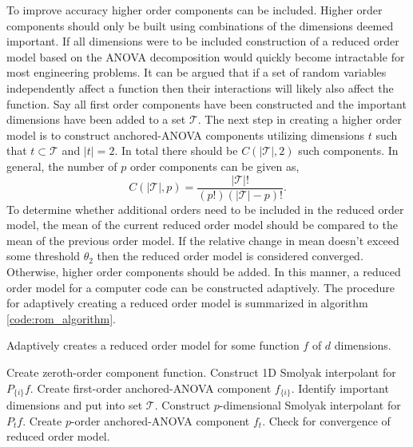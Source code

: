To improve accuracy higher order components can be included. Higher order components should only be built using combinations of the dimensions deemed important. If all dimensions were to be included construction of a reduced order model based on the \ac{ANOVA} decomposition would quickly become intractable for most engineering problems. It can be argued that if a set of random variables independently affect a function then their interactions will likely also affect the function. Say all first order components have been constructed and the important dimensions have been added to a set $\mathcal{T}$. The next step in creating a higher order model is to construct anchored-\ac{ANOVA} components utilizing dimensions $t$ such that $t\subset\mathcal{T}$ and $\vert t\vert=2$. In total there should be $C(\vert\mathcal{T}\vert,2)$ such components. In general, the number of $p$ order components can be given as,
\begin{equation} \label{eq:num_components_rom_order_p}
   C(\vert\mathcal{T}\vert,p) = \frac{\vert\mathcal{T}\vert!}{
    (p!)(\vert\mathcal{T}\vert-p)!}.
\end{equation}
To determine whether additional orders need to be included in the reduced order model, the mean of the current reduced order model should be compared to the mean of the previous order model. If the relative change in mean doesn't exceed some threshold $\theta_2$ then the reduced order model is considered converged. Otherwise, higher order components should be added. In this manner, a reduced order model for a computer code can be constructed adaptively. The procedure for adaptively creating a reduced order model is summarized in algorithm \ref{code:rom_algorithm}.    
\begin{algorithm}
\caption{\label{code:rom_algorithm} Adaptively creates a reduced order model for some function $f$ of $d$ dimensions.}  
\begin{algorithmic}[1]
\State Create zeroth-order component function. 
   \State Construct 1D Smolyak interpolant for $P_{\lbrace i \rbrace}f$.
   \State Create first-order anchored-\ac{ANOVA} component $f_{\lbrace i\rbrace}$.
\EndFor
\State Identify important dimensions and put into set $\mathcal{T}$.
      \State Construct $p$-dimensional Smolyak interpolant for 
      $P_{t}f$.
      \State Create $p$-order anchored-\ac{ANOVA} component $f_t$.
   \EndFor
   \State Check for convergence of reduced order model.
\EndFor  
\end{algorithmic}
\end{algorithm}

